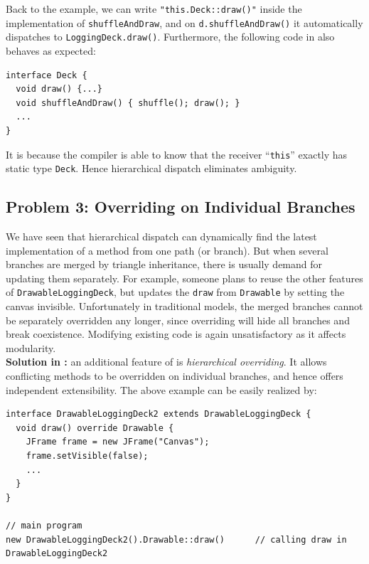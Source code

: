 Back to the example, we can write \lstinline|"this.Deck::draw()"| inside the implementation of \lstinline|shuffleAndDraw|, and on \lstinline|d.shuffleAndDraw()| it automatically dispatches to \lstinline|LoggingDeck.draw()|. Furthermore, the following code in \name{}
also behaves as expected:
\vspace{3pt}\begin{lstlisting}
interface Deck {
  void draw() {...}
  void shuffleAndDraw() { shuffle(); draw(); }
  ...
}
\end{lstlisting}\vspace{3pt}
It is because the compiler is able to know that the receiver ``\lstinline|this|'' exactly has static type \lstinline|Deck|. Hence hierarchical dispatch eliminates ambiguity.

\subsection{Problem 3: Overriding on Individual Branches}\label{subsec:partialoverrides}

We have seen that hierarchical dispatch can dynamically find the latest implementation of a method from one path (or branch). But when
several branches are merged by triangle inheritance, there is usually demand for updating them separately. For example, someone plans to
reuse the other features of \lstinline|DrawableLoggingDeck|, but updates the \lstinline|draw| from \lstinline|Drawable| by setting the canvas
invisible. Unfortunately in traditional models, the merged branches cannot be separately overridden any longer, since overriding
will hide all branches and break coexistence. Modifying existing code is again unsatisfactory as it affects modularity.\\

\noindent\textbf{Solution in \name{}:} an additional feature of \name{} is \textit{hierarchical overriding}. It allows conflicting methods
to be overridden on individual branches, and hence offers independent extensibility. The above example can be easily realized by:
\vspace{3pt}\begin{lstlisting}
interface DrawableLoggingDeck2 extends DrawableLoggingDeck {
  void draw() override Drawable {
    JFrame frame = new JFrame("Canvas");
    frame.setVisible(false);
    ...
  }
}

// main program
new DrawableLoggingDeck2().Drawable::draw()      // calling draw in DrawableLoggingDeck2
\end{lstlisting}\vspace{3pt}

